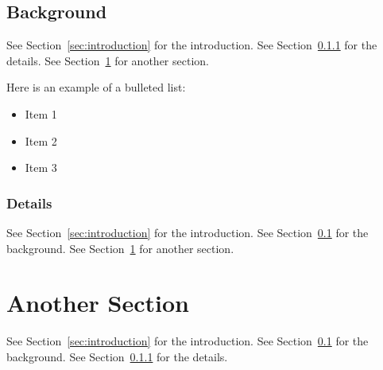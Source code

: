 \documentclass[12pt]{article}
\begin{document}
\subsection{Background}
\label{sec:background}
See Section~\ref{sec:introduction} for the introduction.
See Section~\ref{sec:details} for the details.
See Section~\ref{sec:another-section} for another section.

Here is an example of a bulleted list:
\begin{itemize}
  \item Item 1
  \item Item 2
  \item Item 3
\end{itemize}

\subsubsection{Details}
\label{sec:details}
See Section~\ref{sec:introduction} for the introduction.
See Section~\ref{sec:background} for the background.
See Section~\ref{sec:another-section} for another section.

\section{Another Section}
\label{sec:another-section}
See Section~\ref{sec:introduction} for the introduction.
See Section~\ref{sec:background} for the background.
See Section~\ref{sec:details} for the details.

\label{LastPage}
\end{document}
